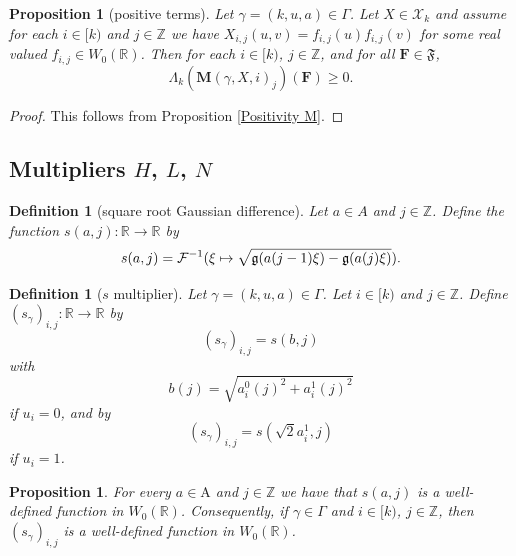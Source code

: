\documentclass[12pt,reqno]{amsart}
\theoremstyle{plain}
\newtheorem{proposition}[theorem]{Proposition}
\newtheorem{definition}[theorem]{Definition}
\numberwithin{equation}{section}
\theoremstyle{remark}
\newcommand{\using}[1]{}
\newcommand{\Z}{{\mathbb Z}}
\newcommand{\R}{{\mathbb R}}
\newcommand{\M}{\mathbf{M}}
\newcommand{\F}{\mathbf{F}}
\begin{document}
\begin{proposition}[positive terms]\label{positive terms}\using{Positivity M}
Let $\gamma=(k,u,a)\in \Gamma$. Let $X\in \mathcal{X}_k$ and assume for each $i\in [k)$ and  $j\in \Z$ we have
 $X_{i,j}(u,v)=f_{i,j}(u)f_{i,j}(v)$ for some real valued $f_{i,j}\in W_0(\R)$.
Then for each $i\in [k)$, $j\in\Z$, and for all $\F\in {\mathfrak{F}}$,
\begin{equation}\label{E:form-nonnegative}
    \Lambda_k(\M(\gamma,X,i)_j)(\mathbf{F})\ge 0.
\end{equation}
\end{proposition}

\begin{proof}
This follows from Proposition \ref{Positivity M}.
\end{proof}

\subsection{\texorpdfstring{Multipliers $H$, $L$, $N$}{Multipliers H, L, N}}

\begin{definition}[square root Gaussian difference]\label{square root Gaussian difference}
Let $a\in A$ and $j\in\Z$.
Define the function $s(a,j):\R \to \R$ by
\begin{equation}\label{auto:diagonal-Gaussian-square-root}s(a,j) = \mathcal{F}^{-1}(\xi \mapsto \sqrt{\mathfrak{g}(a(j-1)\xi)-\mathfrak{g}(a(j) \xi)}).\end{equation}
\end{definition}

\begin{definition}[$s$ multiplier]\label{s multiplier}
    Let $\gamma=(k,u,a)\in \Gamma$. Let $i\in [k)$ and
    $j\in \Z$. Define  $(s_{\gamma})_{i,j}: \R \to \R$ by
\begin{equation}\label{E:b-definition}
   (s_{\gamma})_{i,j}=s(b,j)
\end{equation}
with
\begin{equation}\label{auto:combined-scale-b}
   b(j)=\sqrt{a_{i}^0(j)^2 + a_{i}^1(j)^2}
\end{equation}
if $u_i=0$, and by
\begin{equation}\label{auto:sandwich-square-root-factor}
   (s_{\gamma})_{i,j}=s(\sqrt{2}a_{i}^1,j)
\end{equation}
if $u_i=1$.
\end{definition}

\begin{proposition}\label{square root Gaussian difference W0}\using{diagonal square root}\using{Operations on spaced sequences}
  For every $a\in\mathrm{A}$ and $j\in\mathbb{Z}$
  we have that $s(a,j)$ is a well-defined function in $W_0(\R)$. Consequently, if $\gamma \in \Gamma$ and $i\in [k)$, $j\in \Z$, then $(s_{\gamma})_{i,j}$ is a well-defined function in $W_0(\R)$.
\end{proposition}
\end{document}
